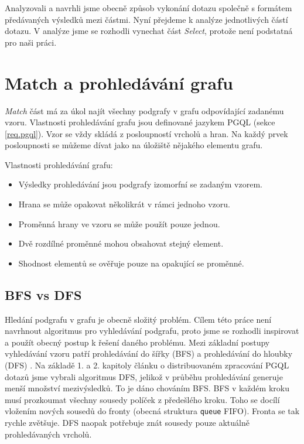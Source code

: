 Analyzovali a navrhli jsme obecně způsob vykonání dotazu společně s formátem předávaných výsledků mezi částmi. 
Nyní přejdeme k analýze jednotlivých částí dotazu. 
V analýze jsme se rozhodli vynechat část \textit{Select}, protože není podstatná pro naši práci.

\section{Match a prohledávání grafu} \label{anal.match}

\textit{Match} část má za úkol najít všechny podgrafy v grafu odpovídající zadanému vzoru.
Vlastnosti prohledávání grafu jsou definované jazykem PGQL (sekce \ref{req.pgql}).
Vzor se vždy skládá z posloupností vrcholů a hran.
Na každý prvek posloupnosti se můžeme dívat jako na úložiště nějakého elementu grafu.

Vlastnosti prohledávání grafu:
\begin{itemize}

\item Výsledky prohledávání jsou podgrafy izomorfní se zadaným vzorem.
\item Hrana se může opakovat několikrát v rámci jednoho vzoru.
\item Proměnná hrany ve vzoru se může použít pouze jednou.
\item Dvě rozdílné proměnné mohou obsahovat stejný element.
\item Shodnost elementů se ověřuje pouze na opakující se proměnné.

\end{itemize}

\subsection{BFS vs DFS}

Hledání podgrafu v grafu je obecně složitý problém. 
Cílem této práce není navrhnout algoritmus pro vyhledávání podgrafu, proto jsme se rozhodli inspirovat a použít obecný postup k řešení daného problému.
Mezi základní postupy vyhledávání vzoru patří prohledávání do šířky (BFS) a prohledávání do hloubky (DFS) \citep[kap. 4]{graphAlg}. 
Na základě 1. a 2. kapitoly článku o distribuovaném zpracování PGQL dotazů \citep{asyncPGX} jsme vybrali algoritmus DFS, jelikož v průběhu prohledávání generuje menší množství mezivýsledků.
To je dáno chováním BFS.
BFS v každém kroku musí prozkoumat všechny sousedy políček z předešlého kroku.
Toho se docílí vložením nových sousedů do fronty (obecná struktura \texttt{queue} FIFO).
Fronta se tak rychle zvětšuje.
DFS naopak potřebuje znát sousedy pouze aktuálně prohledávaných vrcholů.

